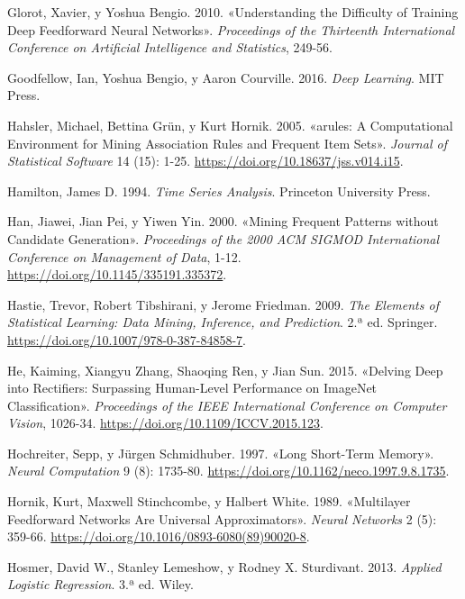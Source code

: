 \documentclass[
  spanish,
  10.5pt,
  letterpaper,
  DIV=11,
  numbers=noendperiod,
  oneside,
  open=any]{scrreprt}
\newlength{\cslhangindent}
\newenvironment{CSLReferences}[2] %
 {\begin{list}{}{%
  \setlength{\itemindent}{0pt}
  \setlength{\leftmargin}{0pt}
  \setlength{\parsep}{0pt}
  \ifodd #1
   \setlength{\leftmargin}{\cslhangindent}
   \setlength{\itemindent}{-1\cslhangindent}
  \fi
  \setlength{\itemsep}{#2\baselineskip}}}
 {\end{list}}
\theoremstyle{definition}
\theoremstyle{definition}
\theoremstyle{plain}
\theoremstyle{remark}
\begin{document}
\begin{CSLReferences}{1}{1}
Glorot, Xavier, y Yoshua Bengio. 2010. {«Understanding the Difficulty of
Training Deep Feedforward Neural Networks»}. \emph{Proceedings of the
Thirteenth International Conference on Artificial Intelligence and
Statistics}, 249-56.

Goodfellow, Ian, Yoshua Bengio, y Aaron Courville. 2016. \emph{Deep
Learning}. MIT Press.

Hahsler, Michael, Bettina Grün, y Kurt Hornik. 2005. {«arules: A
Computational Environment for Mining Association Rules and Frequent Item
Sets»}. \emph{Journal of Statistical Software} 14 (15): 1-25.
\url{https://doi.org/10.18637/jss.v014.i15}.

Hamilton, James D. 1994. \emph{Time Series Analysis}. Princeton
University Press.

Han, Jiawei, Jian Pei, y Yiwen Yin. 2000. {«Mining Frequent Patterns
without Candidate Generation»}. \emph{Proceedings of the 2000 ACM SIGMOD
International Conference on Management of Data}, 1-12.
\url{https://doi.org/10.1145/335191.335372}.

Hastie, Trevor, Robert Tibshirani, y Jerome Friedman. 2009. \emph{The
Elements of Statistical Learning: Data Mining, Inference, and
Prediction}. 2.ª ed. Springer.
\url{https://doi.org/10.1007/978-0-387-84858-7}.

He, Kaiming, Xiangyu Zhang, Shaoqing Ren, y Jian Sun. 2015. {«Delving
Deep into Rectifiers: Surpassing Human-Level Performance on ImageNet
Classification»}. \emph{Proceedings of the IEEE International Conference
on Computer Vision}, 1026-34.
\url{https://doi.org/10.1109/ICCV.2015.123}.

Hochreiter, Sepp, y Jürgen Schmidhuber. 1997. {«Long Short-Term
Memory»}. \emph{Neural Computation} 9 (8): 1735-80.
\url{https://doi.org/10.1162/neco.1997.9.8.1735}.

Hornik, Kurt, Maxwell Stinchcombe, y Halbert White. 1989. {«Multilayer
Feedforward Networks Are Universal Approximators»}. \emph{Neural
Networks} 2 (5): 359-66.
\url{https://doi.org/10.1016/0893-6080(89)90020-8}.

Hosmer, David W., Stanley Lemeshow, y Rodney X. Sturdivant. 2013.
\emph{Applied Logistic Regression}. 3.ª ed. Wiley.


\end{CSLReferences}
\end{document}
